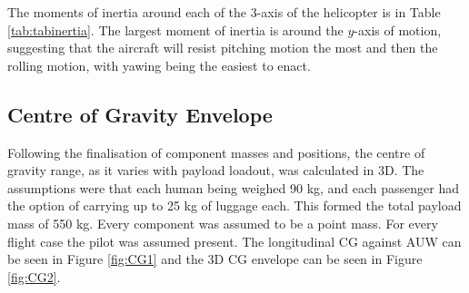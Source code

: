 \documentclass[11pt,a4paper]{article}
\begin{document}
The moments of inertia around each of the 3-axis of the helicopter is in Table \ref{tab:tabinertia}. The largest moment of inertia is around the $y$-axis of motion, suggesting that the aircraft will resist pitching motion the most and then the rolling motion, with yawing being the easiest to enact.


\subsection{Centre of Gravity Envelope}
Following the finalisation of component masses and positions, the centre of gravity range, as it varies with payload loadout, was calculated in 3D. The assumptions were that each human being weighed 90 kg, and each passenger had the option of carrying up to 25 kg of luggage each. This formed the total payload mass of 550 kg. Every component was assumed to be a point mass. For every flight case the pilot was assumed present.
The longitudinal CG against AUW can be seen in Figure \ref{fig:CG1} and the 3D CG envelope can be seen in Figure \ref{fig:CG2}.
\end{document}
